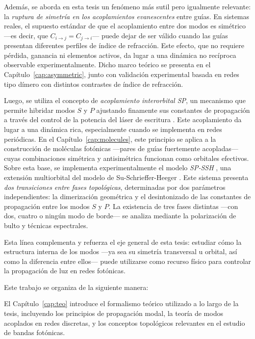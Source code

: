 Además, se aborda en esta tesis un fenómeno más sutil pero igualmente relevante: la \textit{ruptura de simetría en los acoplamientos evanescentes} entre guías. En sistemas reales, el supuesto estándar de que el acoplamiento entre dos modos es simétrico —es decir, que \( C_{i \to j} = C_{j \to i} \)— puede dejar de ser válido cuando las guías presentan diferentes perfiles de índice de refracción. Este efecto, que no requiere pérdida, ganancia ni elementos activos, da lugar a una dinámica no recíproca observable experimentalmente. Dicho marco teórico se presenta en el Capítulo~\ref{cap:asymmetric}, junto con validación experimental basada en redes tipo dímero con distintos contrastes de índice de refracción.

Luego, se utiliza el concepto de \textit{acoplamiento interorbital SP}, un mecanismo que permite hibridar modos \( S \) y \( P \) ajustando finamente sus constantes de propagación a través del control de la potencia del láser de escritura \cite{interorbital}. Este acoplamiento da lugar a una dinámica rica, especialmente cuando se implementa en redes periódicas. En el Capítulo~\ref{cap:molecules}, este principio se aplica a la construcción de moléculas fotónicas —pares de guías fuertemente acopladas— cuyas combinaciones simétrica y antisimétrica funcionan como orbitales efectivos. Sobre esta base, se implementa experimentalmente el modelo \textit{SP-SSH} \cite{SPSSH}, una extensión multiorbital del modelo de Su-Schrieffer-Heeger \citep{ssh}. Este sistema presenta \textit{dos transiciones entre fases topológicas}, determinadas por dos parámetros independientes: la dimerización geométrica y el desintonizado de las constantes de propagación entre los modos $S$ y $P$. La existencia de tres fases distintas —con dos, cuatro o ningún modo de borde— se analiza mediante la polarización de bulto y técnicas espectrales.

 

Esta línea complementa y refuerza el eje general de esta tesis: estudiar cómo la estructura interna de los modos —ya sea su simetría transversal u orbital, así como la diferencia entre ellos— puede utilizarse como recurso físico para controlar la propagación de luz en redes fotónicas.


\vspace{1em}

Este trabajo se organiza de la siguiente manera:

El Capítulo~\ref{cap:teo} introduce el formalismo teórico utilizado a lo largo de la tesis, incluyendo los principios de propagación modal, la teoría de modos acoplados en redes discretas, y los conceptos topológicos relevantes en el estudio de bandas fotónicas.

